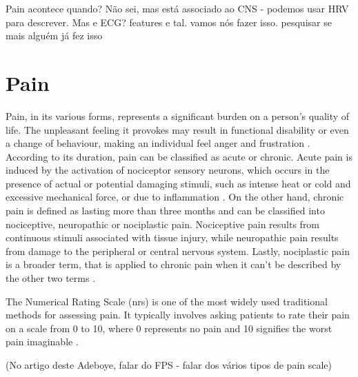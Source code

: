 Pain acontece quando? Não sei, mas está associado ao CNS - podemos usar HRV para descrever. Mas e ECG? features e tal. vamos nós fazer isso. pesquisar se mais alguém já fez isso


\section{Pain}

Pain, in its various forms, represents a significant burden on a person's quality of life. The unpleasant feeling it provokes may result in functional disability or even a change of behaviour, making an individual feel anger and frustration \cite{Dirk2021}. According to its duration, pain can be classified as acute or chronic. Acute pain is induced by the activation of nociceptor sensory neurons, which occurs in the presence of actual or potential damaging stimuli, such as intense heat or cold and excessive mechanical force, or due to inflammation \cite{Jayakar2021}. On the other hand, chronic pain is defined as lasting more than three months \cite{Raman2022} and can be classified into nociceptive, neuropathic or nociplastic pain. Nociceptive pain results from continuous stimuli associated with tissue injury, while neuropathic pain results from damage to the peripheral or central nervous system. Lastly, nociplastic pain is a broader term, that is applied to chronic pain when it can't be described by the other two terms \cite{Fitzcharles2021}.

The Numerical Rating Scale (\ac{nrs}) is one of the most widely used traditional methods for assessing pain. It typically involves asking patients to rate their pain on a scale from 0 to 10, where 0 represents no pain and 10 signifies the worst pain imaginable \cite{Nugent2021,Adeboye2021}. 

(No artigo deste Adeboye, falar do FPS - falar dos vários tipos de pain scale)
